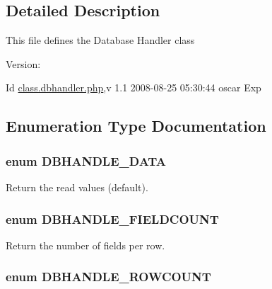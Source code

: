 \subsection{Detailed Description}
This file defines the Database Handler class \begin{Desc}
\item[Version:]\end{Desc}
\begin{Desc}
\item[Id]\hyperlink{class_8dbhandler_8php}{class.dbhandler.php},v 1.1 2008-08-25 05:30:44 oscar Exp \end{Desc}


\subsection{Enumeration Type Documentation}
\hypertarget{class_8dbhandler_8php_cc5178c2a582eafa4ef488ed3394b725}{
\subsubsection{\setlength{\rightskip}{0pt plus 5cm}enum {\bf DBHANDLE\_\-DATA}}}
\label{class_8dbhandler_8php_cc5178c2a582eafa4ef488ed3394b725}


Return the read values (default). 

\hypertarget{class_8dbhandler_8php_fda554c4527b03446f287291626c12ad}{
\subsubsection{\setlength{\rightskip}{0pt plus 5cm}enum {\bf DBHANDLE\_\-FIELDCOUNT}}}
\label{class_8dbhandler_8php_fda554c4527b03446f287291626c12ad}


Return the number of fields per row. 

\hypertarget{class_8dbhandler_8php_c904f05455a162c07c216c330ad7c5c6}{
\subsubsection{\setlength{\rightskip}{0pt plus 5cm}enum {\bf DBHANDLE\_\-ROWCOUNT}}}
\label{class_8dbhandler_8php_c904f05455a162c07c216c330ad7c5c6}


